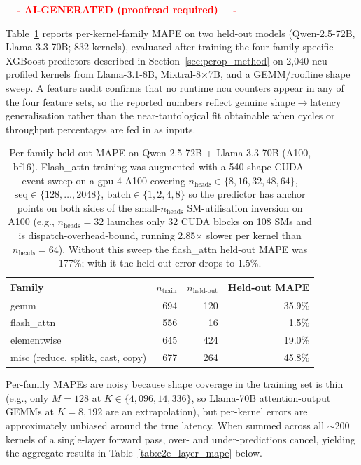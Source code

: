 \begin{center}\textcolor{red}{\small\textbf{---- AI-GENERATED (proofread required) ----}}\end{center}

Table~\ref{tab:perkernel_mape} reports per-kernel-family MAPE on two held-out models (Qwen-2.5-72B, Llama-3.3-70B; 832 kernels), evaluated after training the four family-specific XGBoost predictors described in Section~\ref{sec:perop_method} on 2{,}040 ncu-profiled kernels from Llama-3.1-8B, Mixtral-8$\times$7B, and a GEMM/roofline shape sweep. A feature audit confirms that no runtime ncu counters appear in any of the four feature sets, so the reported numbers reflect genuine shape$\to$latency generalisation rather than the near-tautological fit obtainable when cycles or throughput percentages are fed in as inputs.

\begin{table}[!htbp]
\caption{Per-family held-out MAPE on Qwen-2.5-72B + Llama-3.3-70B (A100, bf16). Flash\_attn training was augmented with a 540-shape CUDA-event sweep on a gpu-4 A100 covering $n_\text{heads}\in\{8,16,32,48,64\}$, $\text{seq}\in\{128,\ldots,2048\}$, $\text{batch}\in\{1,2,4,8\}$ so the predictor has anchor points on both sides of the small-$n_\text{heads}$ SM-utilisation inversion on A100 (e.g., $n_\text{heads}{=}32$ launches only 32 CUDA blocks on 108 SMs and is dispatch-overhead-bound, running 2.85$\times$ slower per kernel than $n_\text{heads}{=}64$). Without this sweep the flash\_attn held-out MAPE was 177\%; with it the held-out error drops to 1.5\%.}
\label{tab:perkernel_mape}
\centering
\small
\begin{tabular}{@{}lrrr@{}}
\toprule
\textbf{Family} & \textbf{$n_\text{train}$} & \textbf{$n_\text{held-out}$} & \textbf{Held-out MAPE} \\
\midrule
gemm         & 694 & 120 & 35.9\% \\
flash\_attn  & 556 &  16 &   1.5\% \\
elementwise  & 645 & 424 & 19.0\% \\
misc (reduce, splitk, cast, copy) & 677 & 264 & 45.8\% \\
\bottomrule
\end{tabular}
\end{table}

Per-family MAPEs are noisy because shape coverage in the training set is thin (e.g., only $M{=}128$ at $K{\in}\{4{,}096, 14{,}336\}$, so Llama-70B attention-output GEMMs at $K{=}8{,}192$ are an extrapolation), but per-kernel errors are approximately unbiased around the true latency. When summed across all $\sim$200 kernels of a single-layer forward pass, over- and under-predictions cancel, yielding the aggregate results in Table~\ref{tab:e2e_layer_mape} below.


